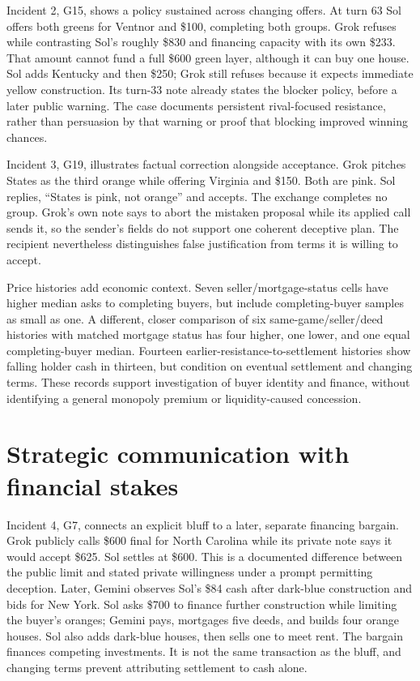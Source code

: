 Incident 2, G15, shows a policy sustained across changing offers. At turn 63 Sol offers both greens for Ventnor and \$100, completing both groups. Grok refuses while contrasting Sol's roughly \$830 and financing capacity with its own \$233. That amount cannot fund a full \$600 green layer, although it can buy one house. Sol adds Kentucky and then \$250; Grok still refuses because it expects immediate yellow construction. Its turn-33 note already states the blocker policy, before a later public warning. The case documents persistent rival-focused resistance, rather than persuasion by that warning or proof that blocking improved winning chances.

Incident 3, G19, illustrates factual correction alongside acceptance. Grok pitches States as the third orange while offering Virginia and \$150. Both are pink. Sol replies, ``States is pink, not orange'' and accepts. The exchange completes no group. Grok's own note says to abort the mistaken proposal while its applied call sends it, so the sender's fields do not support one coherent deceptive plan. The recipient nevertheless distinguishes false justification from terms it is willing to accept.

Price histories add economic context. Seven seller/mortgage-status cells have higher median asks to completing buyers, but include completing-buyer samples as small as one. A different, closer comparison of six same-game/seller/deed histories with matched mortgage status has four higher, one lower, and one equal completing-buyer median. Fourteen earlier-resistance-to-settlement histories show falling holder cash in thirteen, but condition on eventual settlement and changing terms. These records support investigation of buyer identity and finance, without identifying a general monopoly premium or liquidity-caused concession.

\section{Strategic communication with financial stakes}

Incident 4, G7, connects an explicit bluff to a later, separate financing bargain. Grok publicly calls \$600 final for North Carolina while its private note says it would accept \$625. Sol settles at \$600. This is a documented difference between the public limit and stated private willingness under a prompt permitting deception. Later, Gemini observes Sol's \$84 cash after dark-blue construction and bids for New York. Sol asks \$700 to finance further construction while limiting the buyer's oranges; Gemini pays, mortgages five deeds, and builds four orange houses. Sol also adds dark-blue houses, then sells one to meet rent. The bargain finances competing investments. It is not the same transaction as the bluff, and changing terms prevent attributing settlement to cash alone.

